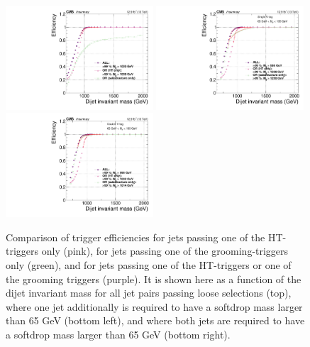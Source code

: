 \begin{figure}[h!]
\centering
\includegraphics[width=0.49\textwidth]{figures/analysis/search2/AN-16-235/plots/triggereffMjj-ALL_noTag.pdf}
\includegraphics[width=0.49\textwidth]{figures/analysis/search2/AN-16-235/plots/triggereffMjj-ALL_SingleTag.pdf}
\includegraphics[width=0.49\textwidth]{figures/analysis/search2/AN-16-235/plots/triggereffMjj-ALL_DoubleTag.pdf}\\
\caption{Comparison of trigger efficiencies for jets passing one of the HT-triggers only (pink), for jets passing one of the grooming-triggers only (green), and for jets passing one of the HT-triggers or one of the grooming triggers (purple). It is shown here as a function of the dijet invariant mass for all jet pairs passing loose selections (top), where one jet additionally is required to have a softdrop mass larger than 65 GeV (bottom left), and where both jets are required to have a softdrop mass larger than 65 GeV (bottom right).}
\label{fig:searchII:trigger-fits}
\end{figure}
